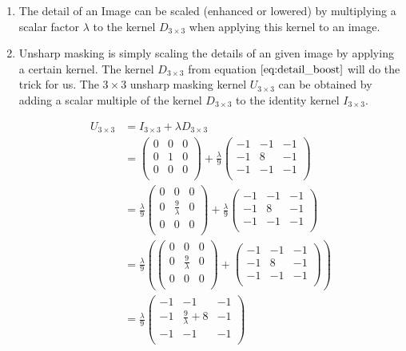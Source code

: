 \documentclass{paper}
\begin{document}
\begin{enumerate}
\item The detail of an Image can be scaled (enhanced or lowered) by multiplying a scalar factor $\lambda$ to the kernel $D_{3 \times 3} $ when applying this kernel to an image.

\item Unsharp masking is simply scaling the details of an given image by applying a certain kernel. The kernel $D_{3 \times 3}$ from equation $\ref{eq:detail_boost}$ will do the trick for us. The $3 \times 3$ unsharp masking kernel $U_{3\times 3}$ can be obtained by adding a scalar multiple of the kernel $D_{3 \times 3}$ to the identity kernel $I_{3 \times 3}$.

\begin{align}
    U_{3\times 3} 
    &= I_{3 \times 3} + \lambda D_{3 \times 3} \\
    &=
\begin{pmatrix}
0 & 0 & 0 \\
0 & 1 & 0 \\
0 & 0 & 0 \\
\end{pmatrix}
+ \frac{\lambda}{9}
\begin{pmatrix}
-1 & -1 & -1 \\
-1 & 8 & -1 \\
-1 & -1 & -1 \\
\end{pmatrix} \\
&=
\frac{\lambda}{9}
\begin{pmatrix}
0 & 0 & 0 \\
0 & \frac{9}{\lambda} & 0 \\
0 & 0 & 0 \\
\end{pmatrix}
+ \frac{\lambda}{9}
\begin{pmatrix}
-1 & -1 & -1 \\
-1 & 8 & -1 \\
-1 & -1 & -1 \\
\end{pmatrix} \\
&=
\frac{\lambda}{9}\left(
\begin{pmatrix}
0 & 0 & 0 \\
0 & \frac{9}{\lambda} & 0 \\
0 & 0 & 0 \\
\end{pmatrix}
+ 
\begin{pmatrix}
-1 & -1 & -1 \\
-1 & 8 & -1 \\
-1 & -1 & -1 \\
\end{pmatrix} \right)\\
&=
\frac{\lambda}{9}
\begin{pmatrix}
-1 & -1 & -1 \\
-1 & \frac{9}{\lambda}+8 & -1 \\
-1 & -1 & -1 \\
\end{pmatrix}
\end{align}

\end{enumerate}
\end{document}
